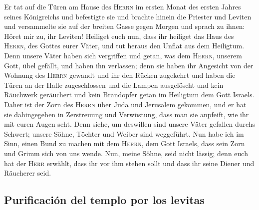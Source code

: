  Er tat auf die Türen am Hause des \textsc{Herrn} im
ersten Monat des ersten Jahres seines Königreichs und befestigte sie
 und brachte hinein die Priester und Leviten und
versammelte sie auf der breiten Gasse gegen Morgen  und
sprach zu ihnen: Höret mir zu, ihr Leviten! Heiliget euch nun, dass ihr
heiliget das Haus des \textsc{Herrn}, des Gottes eurer Väter, und tut
heraus den Unflat aus dem Heiligtum.  Denn unsere Väter
haben sich vergriffen und getan, was dem \textsc{Herrn}, unserem Gott,
übel gefällt, und haben ihn verlassen; denn sie haben ihr Angesicht von
der Wohnung des \textsc{Herrn} gewandt und ihr den Rücken zugekehrt
 und haben die Türen an der Halle zugeschlossen und die
Lampen ausgelöscht und kein Räuchwerk geräuchert und kein Brandopfer
getan im Heiligtum dem Gott Israels.  Daher ist der Zorn
des \textsc{Herrn} über Juda und Jerusalem gekommen, und er hat sie
dahingegeben in Zerstreuung und Verwüstung, dass man sie anpfeift, wie
ihr mit euren Augen seht.  Denn siehe, um deswillen sind
unsere Väter gefallen durchs Schwert; unsere Söhne, Töchter und Weiber
sind weggeführt.  Nun habe ich im Sinn, einen Bund zu
machen mit dem \textsc{Herrn}, dem Gott Israels, dass sein Zorn und
Grimm sich von uns wende.  Nun, meine Söhne, seid nicht
lässig; denn euch hat der \textsc{Herr} erwählt, dass ihr vor ihm stehen
sollt und dass ihr seine Diener und Räucherer seid.

\hypertarget{purificaciuxf3n-del-templo-por-los-levitas}{%
\subsection{Purificación del templo por los
levitas}\label{purificaciuxf3n-del-templo-por-los-levitas}}


